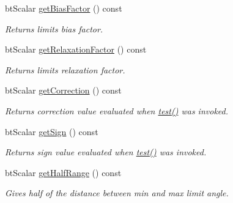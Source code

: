 \begin{DoxyCompactItemize}
bt\+Scalar \hyperlink{classbtAngularLimit_a2ba4c0092e8fd39cdf09113b6aedd740}{get\+Bias\+Factor} () const
\begin{DoxyCompactList}\small\item\em Returns limit\textquotesingle{}s bias factor. \end{DoxyCompactList}\item 
\mbox{\label{classbtAngularLimit_adce9b76f4e9c815806e6bf7ab8928194}} 
bt\+Scalar \hyperlink{classbtAngularLimit_adce9b76f4e9c815806e6bf7ab8928194}{get\+Relaxation\+Factor} () const
\begin{DoxyCompactList}\small\item\em Returns limit\textquotesingle{}s relaxation factor. \end{DoxyCompactList}\item 
\mbox{\label{classbtAngularLimit_a5f29d9654eaf63fb3e70e5d435e65121}} 
bt\+Scalar \hyperlink{classbtAngularLimit_a5f29d9654eaf63fb3e70e5d435e65121}{get\+Correction} () const
\begin{DoxyCompactList}\small\item\em Returns correction value evaluated when \hyperlink{classbtAngularLimit_aa8908e320fa18257118bbe81948142d8}{test()} was invoked. \end{DoxyCompactList}\item 
\mbox{\label{classbtAngularLimit_a862f3e44e3effe07b68ba5da11085fa5}} 
bt\+Scalar \hyperlink{classbtAngularLimit_a862f3e44e3effe07b68ba5da11085fa5}{get\+Sign} () const
\begin{DoxyCompactList}\small\item\em Returns sign value evaluated when \hyperlink{classbtAngularLimit_aa8908e320fa18257118bbe81948142d8}{test()} was invoked. \end{DoxyCompactList}\item 
\mbox{\label{classbtAngularLimit_acce7e5c554ebebbdf15e572dcd0bb2f9}} 
bt\+Scalar \hyperlink{classbtAngularLimit_acce7e5c554ebebbdf15e572dcd0bb2f9}{get\+Half\+Range} () const
\begin{DoxyCompactList}\small\item\em Gives half of the distance between min and max limit angle. \end{DoxyCompactList}\item 

\end{DoxyCompactItemize}
